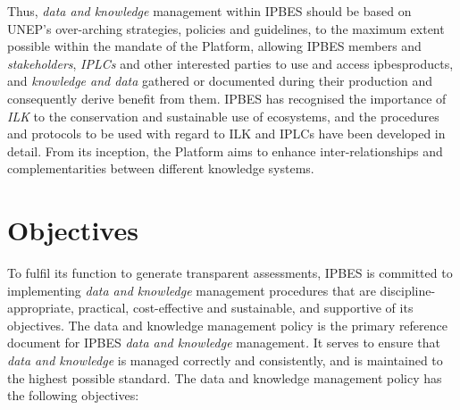 \documentclass{article}
\begin{document}
Thus, \textit{data and knowledge }management within IPBES should be based on UNEP’s over-arching strategies, policies and guidelines, to the maximum extent possible within the mandate of the Platform, allowing IPBES members and \textit{stakeholders}, \textit{IPLCs} and other interested parties to use and access \gls{ipbesproducts}, and \textit{knowledge and data} gathered or documented during their production and consequently derive benefit from them. IPBES has recognised the importance of \textit{ILK} to the conservation and sustainable use of ecosystems, and the procedures and protocols to be used with regard to ILK and IPLCs have been developed in detail. From its inception, the Platform aims to enhance inter-relationships and complementarities between different knowledge systems.

\section{Objectives}

To fulfil its function to generate transparent assessments, IPBES is committed to implementing \textit{data and knowledge} management procedures that are discipline-appropriate, practical, cost-effective and sustainable, and supportive of its objectives. The data and knowledge management policy is the primary reference document for IPBES \textit{data and knowledge }management\textit{.} It serves to ensure that \textit{data and knowledge} is managed correctly and consistently, and is maintained to the highest possible standard. The data and knowledge management policy has the following objectives:
\end{document}
